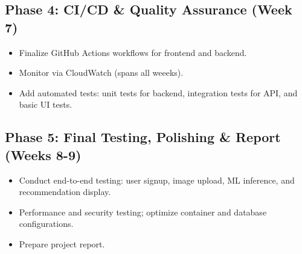\documentclass[11pt]{article}
\begin{document}
\subsection*{Phase 4: CI/CD \& Quality Assurance (Week 7)}
\begin{itemize}
    \item Finalize GitHub Actions workflows for frontend and backend. 
    \item Monitor via CloudWatch (spans all weeeks).
    \item Add automated tests: unit tests for backend, integration tests for API, and basic UI tests.  
\end{itemize}

\subsection*{Phase 5: Final Testing, Polishing \& Report
(Weeks 8-9)}
\begin{itemize}
    \item Conduct end-to-end testing: user signup, image upload, ML inference, and recommendation display.  
    \item Performance and security testing; optimize container and database configurations.
    \item Prepare project report.
\end{itemize}
\end{document}
